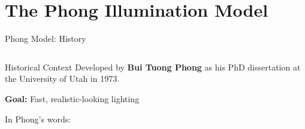 \section{The Phong Illumination Model}

\begin{frame}{Phong Model: History}
  \begin{columns}
    \begin{column}{0.7\textwidth}
      \small
      \begin{conceptbox}{Historical Context}
        Developed by \textbf{Bui Tuong Phong} as his PhD dissertation at the University of Utah in 1973.

        \textbf{Goal:} Fast, realistic-looking lighting
      \end{conceptbox}
      In Phong's words:


\end{column}
\end{columns}
\end{frame}
